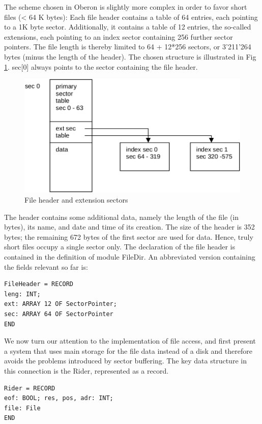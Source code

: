 The scheme chosen in Oberon is slightly more complex in order to favor short files (< 64 K
bytes): Each file header contains a table of 64 entries, each pointing to a 1K byte sector.
Additionally, it contains a table of 12 entries, the so-called extensions, each pointing to an index
sector containing 256 further sector pointers. The file length is thereby limited to 64 + 12*256
sectors, or 3'211'264 bytes (minus the length of the header). The chosen structure is illustrated in
Fig \ref{fig:file-header}. sec[0] always points to the sector containing the file header.
\begin{figure}
	\label{fig:file-header}
	\centering
	\includegraphics[width=\textwidth]{i/l}
	\caption{File header and extension sectors}
\end{figure}

The header contains some additional data, namely the length of the file (in bytes), its name, and
date and time of its creation. The size of the header is 352 bytes; the remaining 672 bytes of the
first sector are used for data. Hence, truly short files occupy a single sector only. The declaration
of the file header is contained in the definition of module FileDir. An abbreviated version
containing the fields relevant so far is:
\begin{verbatim}
FileHeader = RECORD
leng: INT;
ext: ARRAY 12 OF SectorPointer;
sec: ARRAY 64 OF SectorPointer
END
\end{verbatim}

We now turn our attention to the implementation of file access, and first present a system that
uses main storage for the file data instead of a disk and therefore avoids the problems introduced
by sector buffering. The key data structure in this connection is the Rider, represented as a
record.
\begin{verbatim}
Rider = RECORD
eof: BOOL; res, pos, adr: INT;
file: File
END
\end{verbatim}

